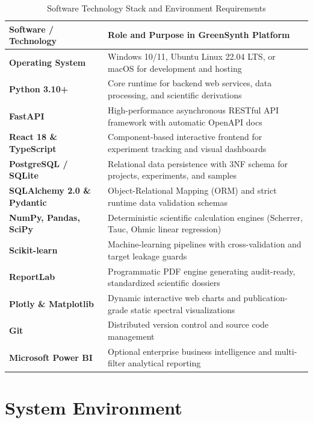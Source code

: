\documentclass[12pt,a4paper,oneside]{report}
\begin{document}
{{{\begin{table}[h!]
\centering
\caption{Software Technology Stack and Environment Requirements}
\label{tab:sw_req}
\begin{tabular}{|p{4.0cm}|p{10.5cm}|}
\hline
\textbf{Software / Technology} & \textbf{Role and Purpose in GreenSynth Platform} \\
\hline
\textbf{Operating System} & Windows 10/11, Ubuntu Linux 22.04 LTS, or macOS for development and hosting \\
\hline
\textbf{Python 3.10+} & Core runtime for backend web services, data processing, and scientific derivations \\
\hline
\textbf{FastAPI} & High-performance asynchronous RESTful API framework with automatic OpenAPI docs \\
\hline
\textbf{React 18 \& TypeScript} & Component-based interactive frontend for experiment tracking and visual dashboards \\
\hline
\textbf{PostgreSQL / SQLite} & Relational data persistence with 3NF schema for projects, experiments, and samples \\
\hline
\textbf{SQLAlchemy 2.0 \& Pydantic} & Object-Relational Mapping (ORM) and strict runtime data validation schemas \\
\hline
\textbf{NumPy, Pandas, SciPy} & Deterministic scientific calculation engines (Scherrer, Tauc, Ohmic linear regression) \\
\hline
\textbf{Scikit-learn} & Machine-learning pipelines with cross-validation and target leakage guards \\
\hline
\textbf{ReportLab} & Programmatic PDF engine generating audit-ready, standardized scientific dossiers \\
\hline
\textbf{Plotly \& Matplotlib} & Dynamic interactive web charts and publication-grade static spectral visualizations \\
\hline
\textbf{Git} & Distributed version control and source code management \\
\hline
\textbf{Microsoft Power BI} & Optional enterprise business intelligence and multi-filter analytical reporting \\
\hline
\end{tabular}
\end{table}

\section{System Environment}

}}}
\end{document}
